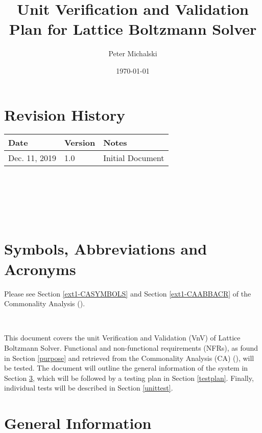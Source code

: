 \documentclass[12pt, titlepage]{article}
\newcommand{\myprogname}{Lattice Boltzmann Solver}
\begin{document}
\title{Unit Verification and Validation Plan for \myprogname} 
\author{Peter Michalski}
\date{\today}
	
\maketitle


\section{Revision History}

\begin{tabularx}{\textwidth}{p{4cm}p{2cm}X}
\toprule {\bf Date} & {\bf Version} & {\bf Notes}\\
\midrule
Dec. 11, 2019 & 1.0 & Initial Document\\
\bottomrule
\end{tabularx}

~\newpage

\tableofcontents

~\newpage

\listoftables

~\newpage

\section{Symbols, Abbreviations and Acronyms}

Please see Section \ref{ext1-CASYMBOLS} and Section \ref{ext1-CAABBACR} of the Commonality Analysis (\citet{LBM_CA_PM}).

~\newpage


\noindent This document covers the unit Verification and Validation (VnV) of {\myprogname}. Functional and non-functional requirements (NFRs), as found in Section \ref{purpose} and retrieved from the Commonality Analysis (CA) (\citet{LBM_CA_PM}), will be tested. The document will outline the general information of the system in Section \ref{generalinfo}, which will be followed by a testing plan in Section \ref{testplan}. Finally, individual tests will be described in Section \ref{unittest}. 

\section{General Information}
\label{generalinfo}
\end{document}
